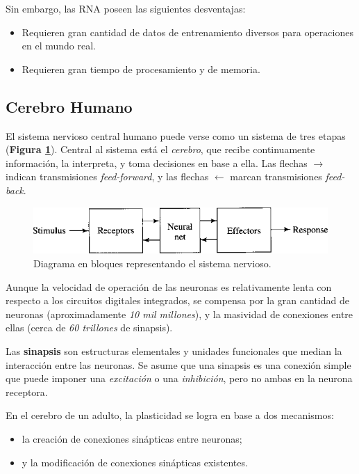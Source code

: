 \documentclass[10pt,a4paper]{article}
\begin{document}
Sin embargo, las RNA poseen las siguientes desventajas:
\begin{itemize}
\item Requieren gran cantidad de datos de entrenamiento diversos para operaciones en el mundo real.
\item Requieren gran tiempo de procesamiento y de memoria.
\end{itemize}

\subsection{Cerebro Humano}

El sistema nervioso central humano puede verse como un sistema de tres etapas (\textbf{Figura \ref{fig:p1_brain}}). Central al sistema está el \textit{cerebro}, que recibe continuamente información, la interpreta, y toma decisiones en base a ella. Las flechas $\rightarrow$ indican transmisiones \textit{feed-forward}, y las flechas $\leftarrow$ marcan transmisiones \textit{feed-back}.

\begin{figure}[ht!]
  \caption{Diagrama en bloques representando el sistema nervioso.}
  \label{fig:p1_brain}
  \centerline{\includegraphics[width=0.65\textwidth-\fboxrule-\fboxrule]{imgs/p1_brain.png}}
\end{figure}

Aunque la velocidad de operación de las neuronas es relativamente lenta con respecto a los circuitos digitales integrados, se compensa por la gran cantidad de neuronas (aproximadamente \textit{10 mil millones}), y la masividad de conexiones entre ellas (cerca de \textit{60 trillones} de sinapsis).

Las \textbf{sinapsis} son estructuras elementales y unidades funcionales que median la interacción entre las neuronas. Se asume que una sinapsis es una conexión simple que puede imponer una \textit{excitación} o una \textit{inhibición}, pero no ambas en la neurona receptora. 

En el cerebro de un adulto, la plasticidad se logra en base a dos mecanismos:
\begin{itemize}
\item la creación de conexiones sinápticas entre neuronas;
\item y la modificación de conexiones sinápticas existentes.
\end{itemize}
\end{document}
